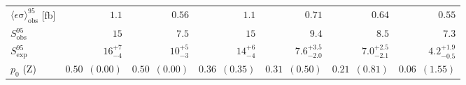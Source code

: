 \begin{table}[tbp]
\begin{center}
\begin{tabular}{|lrrrrrr|}
$\langle\epsilon\mathrm{ \sigma}\rangle_\mathrm{ obs}^{95}$ [fb]   & $1.1$   &  $0.56$  &  $1.1$ & $0.71$ & $0.64$ &  $0.55$ \\
$S_\mathrm{ obs}^{95}$     & $15$ & $7.5$ &$15$ & $9.4$ & $8.5$  &  $7.3$ \\
$S_\mathrm{ exp}^{95}$     & $ { 16 }^{ +7 }_{ -4 }$  & $ { 10 }^{ +5 }_{ -3 }$ & $ { 14 }^{ +6 }_{ -4 }$ & $ { 7.6 }^{ +3.5}_{ -2.0 }$ & $ { 7.0 }^{ +2.5}_{ -2.1 }$  & $ { 4.2 }^{ +1.9 }_{ -0.5 }$\\
$p_{0}$ ($\mathrm{Z}$)        & $ 0.50$~$(0.00)$  & $ 0.50$~$(0.00)$ & $ 0.36$~$(0.35)$ & $ 0.31$~$(0.50)$ & $ 0.21$~$(0.81)$ & $ 0.06$~$(1.55)$ \\
\hline
\end{tabular}





\end{center}
\end{table}
